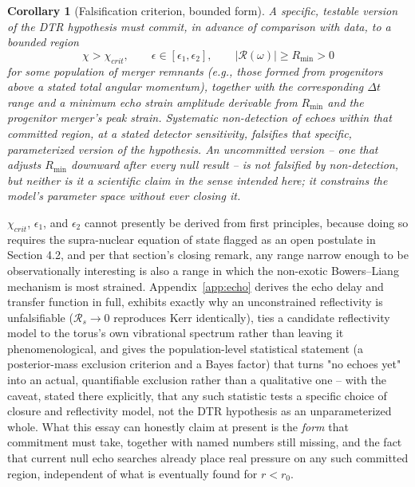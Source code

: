 \documentclass[11pt]{article}
\newtheorem{corollary}{Corollary}
\begin{document}
\begin{corollary}[Falsification criterion, bounded form]
A specific, testable version of the DTR hypothesis must commit, in advance of comparison with data, to a bounded region
\begin{equation}
\chi > \chi_{crit}, \qquad \epsilon \in [\epsilon_1,\epsilon_2], \qquad |\mathcal{R}(\omega)| \geq R_{\min} > 0
\end{equation}
for some population of merger remnants (e.g., those formed from progenitors above a stated total angular momentum), together with the corresponding $\Delta t$ range and a minimum echo strain amplitude derivable from $R_{\min}$ and the progenitor merger's peak strain. Systematic non-detection of echoes within that committed region, at a stated detector sensitivity, falsifies that specific, parameterized version of the hypothesis. An uncommitted version -- one that adjusts $R_{\min}$ downward after every null result -- is not falsified by non-detection, but neither is it a scientific claim in the sense intended here; it constrains the model's parameter space without ever closing it.
\end{corollary}

$\chi_{crit}$, $\epsilon_1$, and $\epsilon_2$ cannot presently be derived from first principles, because doing so requires the supra-nuclear equation of state flagged as an open postulate in Section 4.2, and per that section's closing remark, any range narrow enough to be observationally interesting is also a range in which the non-exotic Bowers--Liang mechanism is most strained. Appendix~\ref{app:echo} derives the echo delay and transfer function in full, exhibits exactly why an unconstrained reflectivity is unfalsifiable ($\mathcal{R}_s\to0$ reproduces Kerr identically), ties a candidate reflectivity model to the torus's own vibrational spectrum rather than leaving it phenomenological, and gives the population-level statistical statement (a posterior-mass exclusion criterion and a Bayes factor) that turns "no echoes yet" into an actual, quantifiable exclusion rather than a qualitative one -- with the caveat, stated there explicitly, that any such statistic tests a specific choice of closure and reflectivity model, not the DTR hypothesis as an unparameterized whole. What this essay can honestly claim at present is the \emph{form} that commitment must take, together with named numbers still missing, and the fact that current null echo searches \cite{cardosopani2019} already place real pressure on any such committed region, independent of what is eventually found for $r < r_0$.
\end{document}

